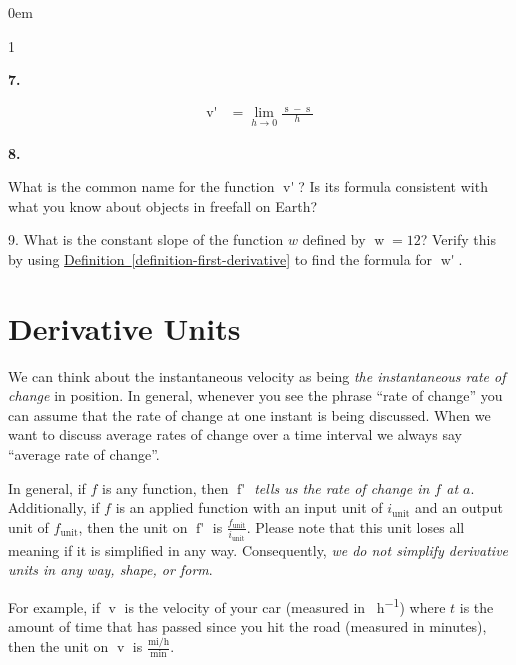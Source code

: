 \documentclass[12pt,]{book}
\theoremstyle{plain}
\theoremstyle{definition}
\numberwithin{equation}{section}
\newenvironment{exercisegroup}%
{\medskip\noindent}%
{\par\bigskip}%
\newlength{\exercisegroupindent}%
\newlength{\exercisegroupitemwidth}%
\newenvironment{exercisegrouplist}%
{\vspace{-\partopsep}%
\begin{adjustwidth}{\exercisegroupindent}{0em}}%
{\end{adjustwidth}%
\vspace{-\partopsep}%
\vspace{\baselineskip}}%
\newenvironment{exercisegroupbycol}[1]%
{\begin{exercisegrouplist}%
\vspace{-\multicolsep}%
\begin{multicols}{#1}%
\setlength{\parindent}{0em}%
\setlength{\exercisegroupitemwidth}{\linewidth}}%
{\end{multicols}%
\vspace{-\multicolsep}%
\end{exercisegrouplist}}%
\newenvironment{exercisegroupitem}[1]%
{\begin{minipage}[t]{\exercisegroupitemwidth}
\vspace{0pt}%
{\bfseries#1}%
\rule{0pt}{\baselineskip}}{\strut%
\end{minipage}%
\hspace{\columnsep}}%
\providecommand\phantomsection{}
\newcommand{\fe}[2]{\mathop{{#1}{\left(#2\right)}}}
\newcommand{\fd}[1]{#1'}
\begin{document}
\begin{exercisegroup}
\begin{exercisegroupbycol}{1}
\begin{exercisegroupitem}{7. }
\begin{align}
\fe{\fd{v}}{t}&=\lim_{h\to0}\frac{\fe{s}{t+h}-\fe{s}{t}}{h}\label{instantaneous-acceleration-equation}
\end{align}%
\end{exercisegroupitem}%
\par%
\begin{exercisegroupitem}{8. }\phantomsection\hypertarget{exercise-192}{\null}
What is the common name for the function \(\fe{\fd{v}}{t}\)? Is its formula consistent with what you know about objects in freefall on Earth?%
\end{exercisegroupitem}%
\par%
\end{exercisegroupbycol}%
\end{exercisegroup}%
\begin{exerciselist}
\item[9.]\phantomsection\hypertarget{exercise-193}{\null}What is the constant slope of the function \(w\) defined by \(\fe{w}{x}=12\)? Verify this by using \hyperref[definition-first-derivative]{Definition~\ref*{definition-first-derivative}} to find the formula for \(\fe{\fd{w}}{x}\).%
\par\smallskip
\end{exerciselist}
\typeout{************************************************}
\typeout{************************************************}
\section[Derivative Units]{Derivative Units}\label{section-derivative-units}
We can think about the instantaneous velocity as being \emph{the instantaneous rate of change} in position. In general, whenever you see the phrase ``rate of change'' you can assume that the rate of change at one instant is being discussed. When we want to discuss average rates of change over a time interval we always say ``average rate of change''.%
\par
In general, if \(f\) is any function, then \emph{\(\fe{\fd{f}}{a}\) tells us the rate of change in \(f\) at \(a\)}. Additionally, if \(f\) is an applied function with an input unit of \(i_{\text{unit}}\) and an output unit of \(f_{\text{unit}}\), then the unit on \(\fe{\fd{f}}{a}\) is \(\frac{f_{\text{unit}}}{i_{\text{unit}}}\). Please note that this unit loses all meaning if it is simplified in any way. Consequently, \emph{we do not simplify derivative units in any way, shape, or form}.%
\par
For example, if \(\fe{v}{t}\) is the velocity of your car (measured in \si{\mile\per\hour}) where \(t\) is the amount of time that has passed since you hit the road (measured in minutes), then the unit on \(\fe{v}{t}\) is \(\frac{\text{mi}/\text{h}}{\text{min}}\).%
\typeout{************************************************}
\typeout{************************************************}
\end{document}
